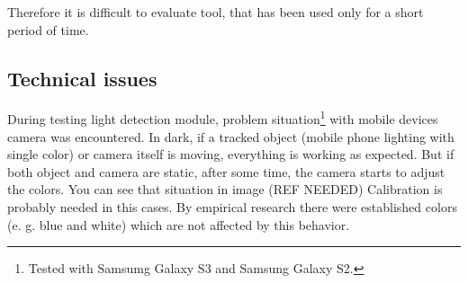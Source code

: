 Therefore it is difficult to evaluate tool, that has been used only for a short period of time.

\subsection{Technical issues}
During testing light detection module, problem situation\footnote{Tested with Samsumg Galaxy S3 and Samsung Galaxy S2.} with mobile devices camera was encountered.
In dark, if a tracked object (mobile phone lighting with single color) or camera itself is moving, everything is working as expected.
But if both object and camera are static, after some time, the camera starts to adjust the colors.
You can see that situation in image 
(REF NEEDED)
Calibration is probably needed in this cases.
By empirical research there were established colors (e. g. blue and white) which are not affected by this behavior.